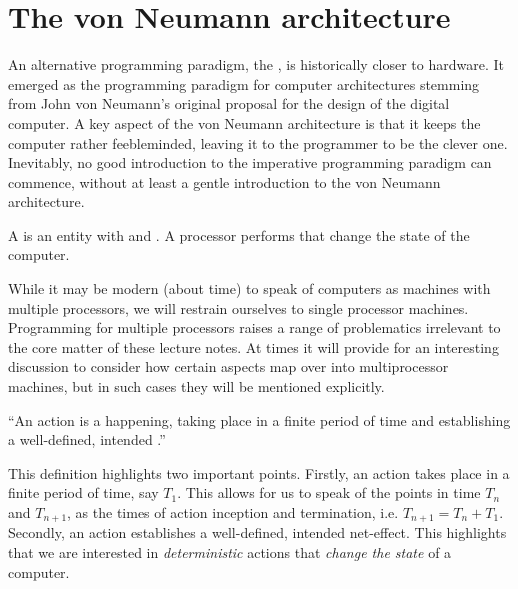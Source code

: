 \section{The von Neumann architecture}

An alternative programming paradigm, the , is historically
closer to hardware. It emerged as the programming paradigm for computer
architectures stemming from John von Neumann's original proposal for the design
of the digital computer\cite{von-neumann}.  A key aspect of the von Neumann
architecture is that it keeps the computer rather feebleminded, leaving it to
the programmer to be the clever one. Inevitably, no good introduction to the
imperative programming paradigm can commence, without at least a gentle
introduction to the von Neumann architecture.

\begin{definition}

A \footnotemark is an entity with  and
. A processor performs  that change the state of
the computer.


\end{definition}

While it may be modern (about time) to speak of computers as machines with
multiple processors, we will restrain ourselves to single processor machines.
Programming for multiple processors raises a range of problematics irrelevant
to the core matter of these lecture notes. At times it will provide for an
interesting discussion to consider how certain aspects map over into
multiprocessor machines, but in such cases they will be mentioned explicitly.

\begin{definition}

``An action is a happening, taking place in a finite period of time and
establishing a well-defined, intended .''
\cite{dijkstra-introduction}

\end{definition}

This definition highlights two important points. Firstly, an action takes place
in a finite period of time, say $T_1$. This allows for us to speak of the
points in time $T_n$ and $T_{n+1}$, as the times of action inception and
termination, i.e. $T_{n+1}=T_n+T_1$. Secondly, an action establishes a
well-defined, intended net-effect. This highlights that we are interested in
\emph{deterministic} actions that \emph{change the state} of a computer.

